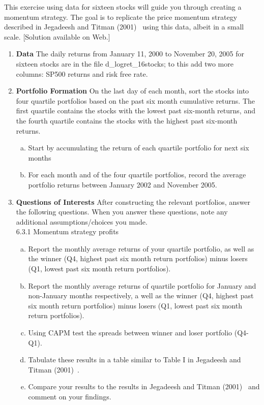 \prob This exercise using data for sixteen stocks will guide you through creating a momentum strategy. The goal is to replicate the price momentum strategy described in Jegadeesh and Titman (2001)~\cite{JeTi} using this data, albeit in a small scale. [Solution available on Web.]
    \begin{enumerate}[6.1]
    \item \textbf{Data} \hfill \break
    The daily returns from January 11, 2000 to November 20, 2005 for sixteen stocks are in the file d\_logret\_16stocks;
to this add two more columns: SP500 returns and risk free rate.
    \item \textbf{Portfolio Formation} \hfill \break
    On the last day of each month, sort the stocks into four quartile portfolios based on the past six month
cumulative returns. The first quartile contains the stocks with the lowest past six-month returns, and the
fourth quartile contains the stocks with the highest past six-month returns.
        \begin{enumerate}[(a)]
        \item Start by accumulating the return of each quartile portfolio for next six months
        \item For each month and of the four quartile portfolios, record the average portfolio returns between January 2002 and November 2005.
        \end{enumerate}
    \item \textbf{Questions of Interests} \hfill \break
    After constructing the relevant portfolios, answer the following questions. When you answer these questions, note any additional assumptions/choices you made. \\
    
    6.3.1 Momentum strategy profits
    \begin{enumerate}[(a)]
    \item Report the monthly average returns of your quartile portfolio, as well as the winner (Q4, highest
past six month return portfolios) minus losers (Q1, lowest past six month return portfolios).
    \item Report the monthly average returns of quartile portfolio for January and non-January months respectively, a well as the winner (Q4, highest past six month return portfolios) minus losers (Q1, lowest
past six month return portfolios).
    \item Using CAPM test the spreads between winner and loser portfolio (Q4-Q1).
    \item Tabulate these results in a table similar to Table I in Jegadeesh and Titman (2001)~\cite{JeTi}.
    \item Compare your results to the results in Jegadeesh and Titman (2001)~\cite{JeTi} and comment on your findings.
    \end{enumerate}
    \end{enumerate}




